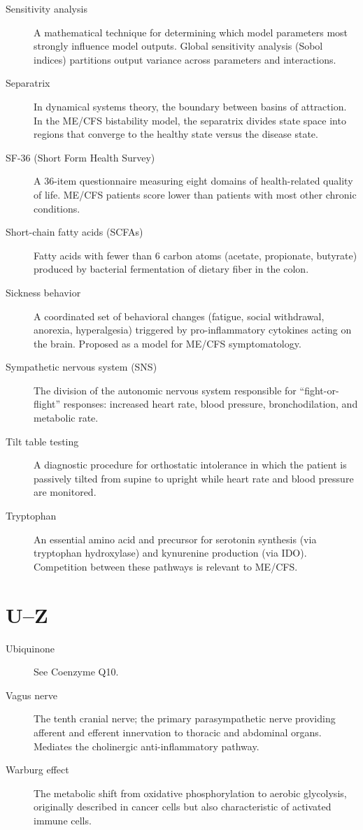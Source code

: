 \begin{description}
\item[Sensitivity analysis] A mathematical technique for determining which model parameters most strongly influence model outputs. Global sensitivity analysis (Sobol indices) partitions output variance across parameters and interactions.
\item[Separatrix] In dynamical systems theory, the boundary between basins of attraction. In the ME/CFS bistability model, the separatrix divides state space into regions that converge to the healthy state versus the disease state.
\item[SF-36 (Short Form Health Survey)] A 36-item questionnaire measuring eight domains of health-related quality of life. ME/CFS patients score lower than patients with most other chronic conditions.
\item[Short-chain fatty acids (SCFAs)] Fatty acids with fewer than 6 carbon atoms (acetate, propionate, butyrate) produced by bacterial fermentation of dietary fiber in the colon.
\item[Sickness behavior] A coordinated set of behavioral changes (fatigue, social withdrawal, anorexia, hyperalgesia) triggered by pro-inflammatory cytokines acting on the brain. Proposed as a model for ME/CFS symptomatology.
\item[Sympathetic nervous system (SNS)] The division of the autonomic nervous system responsible for ``fight-or-flight'' responses: increased heart rate, blood pressure, bronchodilation, and metabolic rate.
\item[Tilt table testing] A diagnostic procedure for orthostatic intolerance in which the patient is passively tilted from supine to upright while heart rate and blood pressure are monitored.
\item[Tryptophan] An essential amino acid and precursor for serotonin synthesis (via tryptophan hydroxylase) and kynurenine production (via IDO). Competition between these pathways is relevant to ME/CFS.
\end{description}

\section*{U--Z}

\begin{description}
\item[Ubiquinone] See Coenzyme Q10.
\item[Vagus nerve] The tenth cranial nerve; the primary parasympathetic nerve providing afferent and efferent innervation to thoracic and abdominal organs. Mediates the cholinergic anti-inflammatory pathway.
\item[Warburg effect] The metabolic shift from oxidative phosphorylation to aerobic glycolysis, originally described in cancer cells but also characteristic of activated immune cells.
\end{description}
